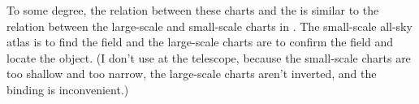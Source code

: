 To some degree, the relation between these charts and the {\PSA} is similar to the relation between the large-scale and small-scale charts in . The small-scale all-sky atlas is to find the field and the large-scale charts are to confirm the field and locate the object. (I don’t use  at the telescope, because the small-scale charts are too shallow and too narrow, the large-scale charts aren’t inverted, and the binding is inconvenient.) 


